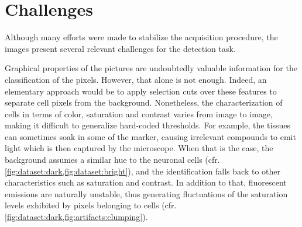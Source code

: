 \section{Challenges}



Although many efforts were made to stabilize the acquisition procedure, the images present several relevant challenges for the detection task. 

Graphical properties of the pictures are undoubtedly valuable information for the classification of the pixels. However, that alone is not enough.
Indeed, an elementary approach would be to apply selection cuts over these features to separate cell pixels from the background.
Nonetheless, the characterization of cells in terms of color, saturation and contrast varies from image to image, making it difficult to generalize hard-coded thresholds.
For example, the tissues can sometimes soak in some of the marker, causing irrelevant compounds to emit light which is then captured by the microscope. 
When that is the case, the background assumes a similar hue to the neuronal cells (cfr. \cref{fig:dataset:dark,fig:dataset:bright}), and the identification falls back to other characteristics such as saturation and contrast.
In addition to that, fluorescent emissions are naturally unstable, thus generating fluctuations of the saturation levels exhibited by pixels belonging to cells (cfr. \cref{fig:dataset:dark,fig:artifacts:clumping}).

